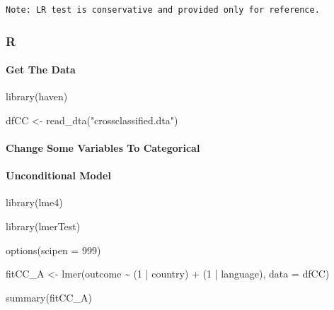 \documentclass[
  letterpaper,
  DIV=11,
  numbers=noendperiod]{scrreprt}
\let\oldparagraph\paragraph
\renewcommand{\paragraph}[1]{\oldparagraph{#1}\mbox{}}
\newenvironment{Shaded}{\begin{snugshade}}{\end{snugshade}}
\newcommand{\AttributeTok}[1]{\textcolor[rgb]{0.40,0.45,0.13}{#1}}
\newcommand{\DecValTok}[1]{\textcolor[rgb]{0.68,0.00,0.00}{#1}}
\newcommand{\FunctionTok}[1]{\textcolor[rgb]{0.28,0.35,0.67}{#1}}
\newcommand{\NormalTok}[1]{\textcolor[rgb]{0.00,0.23,0.31}{#1}}
\newcommand{\OtherTok}[1]{\textcolor[rgb]{0.00,0.23,0.31}{#1}}
\newcommand{\SpecialCharTok}[1]{\textcolor[rgb]{0.37,0.37,0.37}{#1}}
\newcommand{\StringTok}[1]{\textcolor[rgb]{0.13,0.47,0.30}{#1}}
\begin{document}
\begin{verbatim}
Note: LR test is conservative and provided only for reference.
\end{verbatim}

\subsubsection{R}

\paragraph{Get The Data}\label{get-the-data-12}

\begin{Shaded}
\begin{Highlighting}[]
\FunctionTok{library}\NormalTok{(haven)}

\NormalTok{dfCC }\OtherTok{\textless{}{-}} \FunctionTok{read\_dta}\NormalTok{(}\StringTok{"crossclassified.dta"}\NormalTok{)}
\end{Highlighting}
\end{Shaded}

\paragraph{Change Some Variables To
Categorical}\label{change-some-variables-to-categorical-7}

\begin{Shaded}
\end{Shaded}

\paragraph{Unconditional Model}\label{unconditional-model-4}

\begin{Shaded}
\begin{Highlighting}[]
\FunctionTok{library}\NormalTok{(lme4) }

\FunctionTok{library}\NormalTok{(lmerTest)}

\FunctionTok{options}\NormalTok{(}\AttributeTok{scipen =} \DecValTok{999}\NormalTok{) }

\NormalTok{fitCC\_A }\OtherTok{\textless{}{-}} \FunctionTok{lmer}\NormalTok{(outcome }\SpecialCharTok{\textasciitilde{}}  
\NormalTok{                 (}\DecValTok{1} \SpecialCharTok{|}\NormalTok{ country) }\SpecialCharTok{+}
\NormalTok{                 (}\DecValTok{1} \SpecialCharTok{|}\NormalTok{ language),}
             \AttributeTok{data =}\NormalTok{ dfCC)}

\FunctionTok{summary}\NormalTok{(fitCC\_A)}
\end{Highlighting}
\end{Shaded}
\end{document}

